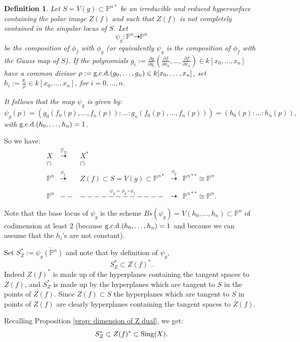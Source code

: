 \documentclass[11pt,a4paper]{amsart}
\newtheorem{defi}[theorem]{Definition}
\newcommand{\PP}{ \mathbb{P}}
\begin{document}
\begin{defi}{\em Let $S=V(g)\subset\PP^{n*}$ be an irreducible and reduced hypersurface  containing the polar image $Z(f)$ and such that $Z(f)$ is not completely contained in the singular locus of $S$.
Let
$$\psi_g\colon\mathbb{P}^n\dashrightarrow\mathbb{P}^n$$
be the composition of $\phi_f$ with $\phi_{g}$ (or equivalently $\psi_g$ is the composition of $\phi_f$ with the Gauss map of $S$).
 If the polynomials
$g_i:=\frac{\partial g}{\partial y_i}(\frac{\partial f}{\partial x_0},\ldots ,\frac{\partial f}{\partial x_n})\in k[x_0,\ldots ,
x_n]$ have a common
divisor $\rho:={\rm g.c.d.}(g_0,\ldots ,g_n)\in k[x_0,\ldots ,
x_n]$,
set $h_i:=\frac{g_i}{\rho}\in k[x_0,\ldots ,
x_n]$, for $i=0,\ldots ,n$.

It follows that the map $\psi_g$ is given by:
$$\psi_g(p) =(g_0(f_0(p),\ldots ,f_n(p))\colon\ldots\colon g_n(f_0(p),\ldots ,f_n(p)))=(h_0(p)\colon\ldots\colon h_n(p)),$$
with ${\rm
g.c.d.}(h_0,\ldots, h_n)=1$.}
\end{defi}

So we have:
$$
\begin{array}{cclcl}
X&\stackrel{\mathcal{G}_X}{\dashrightarrow}&X^*&&\\
\cap&&\cap&&\\
\mathbb{P}^n&\stackrel{\phi_f}{\dashrightarrow}&Z(f)\subset S=V(g)\subset
\mathbb{P}^{n*}&\stackrel{\phi_{g}}{\dashrightarrow}&\mathbb{P}^{n**}\cong \mathbb{P}^n\\ \\
\mathbb{P}^n&--&\stackrel{\psi_g=\phi_g\circ\phi_{f}}{------------}&\dashrightarrow&\mathbb{P}^{n**}\cong
\mathbb{P}^n.
\end{array}
$$
\medskip

Note that the base locus of $\psi_g$ is the scheme
$Bs(\psi_g)=V(h_0,\ldots, h_n)\subset\mathbb{P}^n$ of codimension
at least 2 (because ${\rm g.c.d.}(h_0,\ldots, h_n)=1$ and because
we can assume that the $h_i$'s are not constant).


Set $S^*_Z:=\overline{\psi_g(\mathbb{P}^n)}$ and note that by definition of $\psi_g$,
$$S^*_Z\subset Z(f)^*.$$
Indeed $Z(f)^*$ is made up of the hyperplanes containing the
tangent spaces to $Z(f)$, and $S_Z^*$ is made up by the
hyperplanes which are tangent to $S$ in the points of $Z(f)$.
Since $Z(f)\subset S$ the hyperplanes which are tangent to $S$ in
points of $Z(f)$ are clearly hyperplanes containing the tangent
spaces to $Z(f)$.

Recalling Proposition \ref{prop: dimension of Z dual}, we get:
\begin{equation}\label{image}
S^*_Z\subset Z(f)^*\subset {\rm Sing}(X).
\end{equation}
\end{document}
